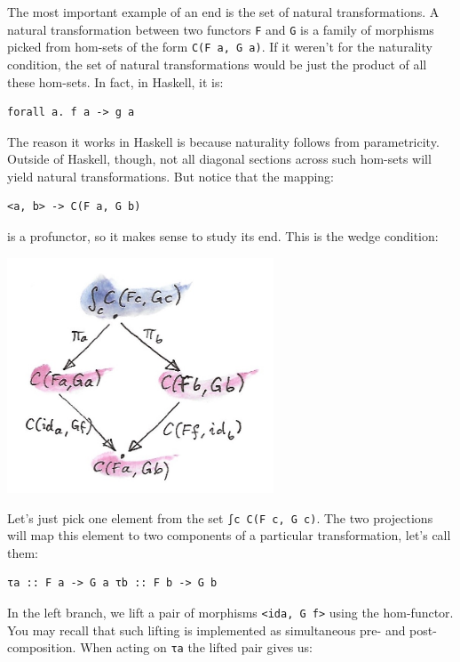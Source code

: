 The most important example of an end is the set of natural
transformations. A natural transformation between two functors
\texttt{F} and \texttt{G} is a family of morphisms picked from hom-sets
of the form \texttt{C(F\ a,\ G\ a)}. If it weren't for the naturality
condition, the set of natural transformations would be just the product
of all these hom-sets. In fact, in Haskell, it is:

\begin{verbatim}
forall a. f a -> g a
\end{verbatim}

The reason it works in Haskell is because naturality follows from
parametricity. Outside of Haskell, though, not all diagonal sections
across such hom-sets will yield natural transformations. But notice that
the mapping:

\begin{verbatim}
<a, b> -> C(F a, G b)
\end{verbatim}

is a profunctor, so it makes sense to study its end. This is the wedge
condition:

\includegraphics[width=3.12500in]{images/end1.jpg}

Let's just pick one element from the set \texttt{∫c\ C(F\ c,\ G\ c)}.
The two projections will map this element to two components of a
particular transformation, let's call them:

\begin{verbatim}
τa :: F a -> G a τb :: F b -> G b
\end{verbatim}

In the left branch, we lift a pair of morphisms
\texttt{\textless{}ida,\ G\ f\textgreater{}} using the hom-functor. You
may recall that such lifting is implemented as simultaneous pre- and
post-composition. When acting on \texttt{τa} the lifted pair gives us:


